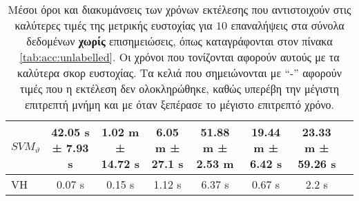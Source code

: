 \begin{table}[]
\begin{adjustbox}{angle=90}
{{\begin{tabular}{|l|c|c|c|c|c|c|c|}
$SVM_{\vartheta}$ &  42.05 s ± 7.93 s &  1.02 m ± 14.72 s &   6.05 m ± 27.1 s &   51.88 m ± 2.53 m &  19.44 m ± 6.42 s &  23.33 m ± 59.26 s \\\hline
VH              &            0.07 s &            0.15 s &            1.12 s &             6.37 s &            0.67 s &              2.2 s \\\hline
\end{tabular}
}
}
\end{adjustbox}
\caption[Μέσοι όροι και διακυμάνσεις των χρόνων εκτέλεσης που αντιστοιχούν στις καλύτερες τιμές της μετρικής ευστοχίας για $10$ επαναλήψεις  στα σύνολα δεδομένων χωρίς επισημειώσεις.]{\small Μέσοι όροι και διακυμάνσεις των χρόνων εκτέλεσης που αντιστοιχούν στις καλύτερες τιμές της μετρικής ευστοχίας για $10$ επαναλήψεις  στα σύνολα δεδομένων \textbf{χωρίς} επισημειώσεις, όπως καταγράφονται στον πίνακα \ref{tab:acc:unlabelled}. Οι χρόνοι που τονίζονται αφορούν αυτούς με τα καλύτερα σκορ ευστοχίας. Τα κελιά που σημειώνονται με ``-'' αφορούν τιμές που η εκτέλεση δεν ολοκληρώθηκε, καθώς υπερέβη την μέγιστη επιτρεπτή μνήμη και με  όταν ξεπέρασε το μέγιστο επιτρεπτό χρόνο.}
\label{tab:time:unlabelled}
\end{table}

